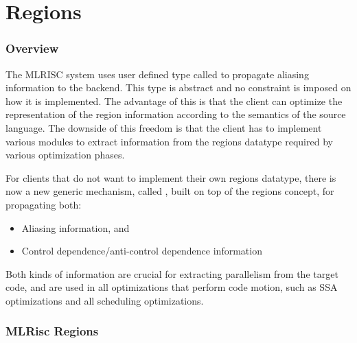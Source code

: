 \section{Regions}
\subsubsection{Overview}

The MLRISC system uses user defined type called
 to propagate
aliasing information to the backend. This type is
abstract and no constraint is imposed on how it is implemented.
The advantage of this is that the client can optimize the representation
of the region information according to the semantics of the source language.
The downside of this freedom is that the client has to implement
various modules to extract information from the regions datatype
required by various optimization phases.

For clients that do not want to implement their own regions datatype,
there is now a new generic mechanism, called 
, built on top of
the regions concept, for propagating both:
\begin{itemize}
  \item Aliasing information, and
  \item Control dependence/anti-control dependence information
\end{itemize}
Both kinds of information are crucial for extracting parallelism
from the target code, and are used in all optimizations that perform code
motion, such as SSA optimizations and all scheduling optimizations. 

\subsubsection{MLRisc Regions}
